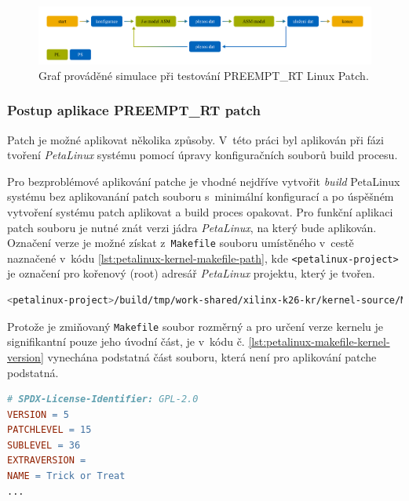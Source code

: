 \documentclass[a4paper, twoside, 11pt]{article}
\newcommand{\fbar}{\FloatBarrier}
\begin{document}
			\begin{figure}[H]
				\centering
					\includegraphics[width=1\textwidth]{src/png/rt-simulation-graph.png} 
					\caption{Graf prováděné simulace při testování PREEMPT\_RT Linux Patch.}
					\label{fig:rt-simulation-graph}
			\end{figure}
			
			\fbar
			\subsubsection{Postup aplikace PREEMPT\_RT patch}\label{subsubsec:postup-aplikace-preempt-rt-patch}
				Patch je možné aplikovat několika způsoby. V~této práci byl aplikován při fázi tvoření \textit{PetaLinux} systému pomocí úpravy konfiguračních souborů build procesu.\par
				Pro bezproblémové aplikování patche je vhodné nejdříve vytvořit \textit{build} PetaLinux systému bez aplikovanání patch souboru s~minimální konfigurací a po úspěšném vytvoření systému patch aplikovat a build proces opakovat. Pro funkční aplikaci patch souboru je nutné znát verzi jádra \textit{PetaLinux}, na který bude aplikován. Označení verze je možné získat z~\texttt{Makefile} souboru umístěného v~cestě naznačené v~kódu \ref{lst:petalinux-kernel-makefile-path}, kde \texttt{<petalinux-project>} je označení pro kořenový (root) adresář \textit{PetaLinux} projektu, který je tvořen.

				\begin{lstlisting}[language={sh}, caption={Cesta Makefile souboru, ze kterého je možné získat označení verze jádra systému PetaLinux.}, label= {lst:petalinux-kernel-makefile-path}]
<petalinux-project>/build/tmp/work-shared/xilinx-k26-kr/kernel-source/Makefile\end{lstlisting}
				Protože je zmiňovaný \texttt{Makefile} soubor rozměrný a pro určení verze kernelu je signifikantní pouze jeho úvodní část, je v~kódu č. \ref{lst:petalinux-makefile-kernel-version} vynechána podstatná část souboru, která není pro aplikování patche podstatná.

				\begin{lstlisting}[language={make}, caption={Významná část Makefile souboru pro určení verze jádra PetaLinux.}, label= {lst:petalinux-makefile-kernel-version}]
# SPDX-License-Identifier: GPL-2.0
VERSION = 5
PATCHLEVEL = 15
SUBLEVEL = 36
EXTRAVERSION =
NAME = Trick or Treat
...\end{lstlisting}
				
\end{document}
